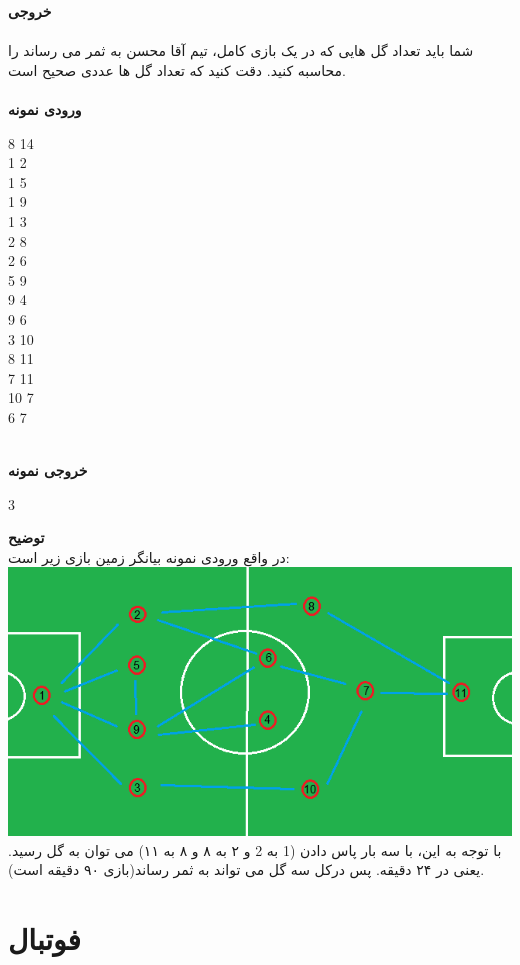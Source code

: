 \documentclass[]{article}
\newcommand{\inputsample}[1]{
    ~\\
    \textbf{ورودی نمونه}
    ~\\
    \begin{tcolorbox}[breakable,boxrule=0pt]
        \begin{latin}
            \large{
                #1
            }
        \end{latin}
    \end{tcolorbox}
}
\newcommand{\outputsample}[1]{
    ~\\
    \textbf{خروجی نمونه}

    \begin{tcolorbox}[breakable,boxrule=0pt]
        \begin{latin}
            \large{
                #1
            }
        \end{latin}
    \end{tcolorbox}
}
\begin{document}
\textbf{خروجی}\\
\\
شما باید تعداد گل هایی که در یک بازی کامل، تیم آقا محسن به ثمر می رساند را محاسبه کنید. دقت کنید که تعداد گل ها عددی صحیح است.
\\

\inputsample{
8 14\\
1 2\\
1 5\\
1 9\\
1 3\\
2 8\\
2 6\\
5 9\\
9 4\\
9 6\\
3 10\\
8 11\\
7 11\\
10 7\\
6 7
}
\outputsample{
3
}

\newpage
\textbf{توضیح}\\
در واقع ورودی نمونه بیانگر زمین بازی زیر است:\\
\includegraphics[width=1\textwidth]{goal-baran.png}
با توجه به این، با سه بار پاس دادن (1 به 2 و ۲ به ۸ و ۸ به ۱۱) می توان به گل رسید. یعنی در ۲۴ دقیقه. پس درکل سه گل می تواند به ثمر رساند(بازی ۹۰ دقیقه است).

\newpage
\section{فوتبال}
\end{document}
